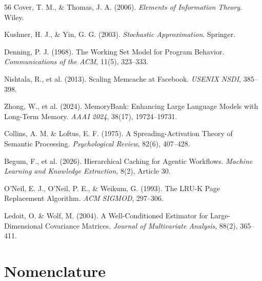 \documentclass[12pt,a4paper]{article}
\theoremstyle{definition}
\theoremstyle{remark}
\begin{document}
\begin{thebibliography}{56}
 Cover, T. M., \& Thomas, J. A. (2006). \textit{Elements of Information Theory}. Wiley.

 Kushner, H. J., \& Yin, G. G. (2003). \textit{Stochastic Approximation}. Springer.

 Denning, P. J. (1968). The Working Set Model for Program Behavior. \textit{Communications of the ACM}, 11(5), 323--333.

 Nishtala, R., et al. (2013). Scaling Memcache at Facebook. \textit{USENIX NSDI}, 385--398.

 Zhong, W., et al. (2024). MemoryBank: Enhancing Large Language Models with Long-Term Memory. \textit{AAAI 2024}, 38(17), 19724--19731.

 Collins, A. M. \& Loftus, E. F. (1975). A Spreading-Activation Theory of Semantic Processing. \textit{Psychological Review}, 82(6), 407--428.

 Begum, F., et al. (2026). Hierarchical Caching for Agentic Workflows. \textit{Machine Learning and Knowledge Extraction}, 8(2), Article 30.

 O'Neil, E. J., O'Neil, P. E., \& Weikum, G. (1993). The LRU-K Page Replacement Algorithm. \textit{ACM SIGMOD}, 297--306.

 Ledoit, O. \& Wolf, M. (2004). A Well-Conditioned Estimator for Large-Dimensional Covariance Matrices. \textit{Journal of Multivariate Analysis}, 88(2), 365--411.

\end{thebibliography}

\newpage
\appendix

\section{Nomenclature}
\label{app:nomenclature}
\end{document}
